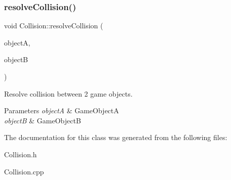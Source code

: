 \subsubsection{\texorpdfstring{resolve\+Collision()}{resolveCollision()}}
{\footnotesize\ttfamily void Collision\+::resolve\+Collision (\begin{DoxyParamCaption}\item[{shared\+\_\+ptr$<$ \mbox{\hyperlink{class_game_object}{Game\+Object}} $>$}]{objectA,  }\item[{shared\+\_\+ptr$<$ \mbox{\hyperlink{class_game_object}{Game\+Object}} $>$}]{objectB }\end{DoxyParamCaption})}



Resolve collision between 2 game objects. 


\begin{DoxyParams}{Parameters}
{\em objectA} & Game\+ObjectA\\
\hline
{\em objectB} & Game\+ObjectB\\
\hline
\end{DoxyParams}


The documentation for this class was generated from the following files\+:\begin{DoxyCompactItemize}
\item 
Collision.\+h\item 
Collision.\+cpp\end{DoxyCompactItemize}
